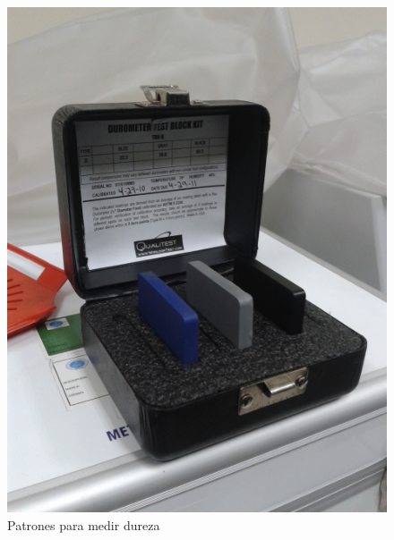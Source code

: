 \documentclass[a4paper, 11pt]{article}
\begin{document}
\begin{figure}[h!] %
\hfill
\begin{minipage}[t]{.45\textwidth}
\begin{center}
\captionsetup{justification=centering}
\includegraphics[scale=0.2]{patrones_dureza_shore.png}
\caption{Patrones para medir dureza}
\label{patrones_dureza_shore}
\end{center}
\end{minipage}
\hfill
\begin{minipage}[t]{.45\textwidth}
\begin{center}
\captionsetup{justification=centering}

\end{center}
\end{minipage}
\end{figure}
\end{document}
